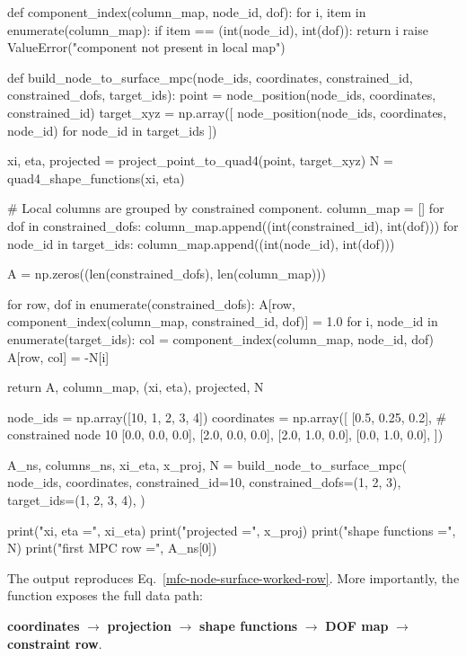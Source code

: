 \begin{python}
def component_index(column_map, node_id, dof):
    for i, item in enumerate(column_map):
        if item == (int(node_id), int(dof)):
            return i
    raise ValueError("component not present in local map")


def build_node_to_surface_mpc(node_ids, coordinates,
                              constrained_id, constrained_dofs,
                              target_ids):
    point = node_position(node_ids, coordinates, constrained_id)
    target_xyz = np.array([
        node_position(node_ids, coordinates, node_id)
        for node_id in target_ids
    ])

    xi, eta, projected = project_point_to_quad4(point, target_xyz)
    N = quad4_shape_functions(xi, eta)

    # Local columns are grouped by constrained component.
    column_map = []
    for dof in constrained_dofs:
        column_map.append((int(constrained_id), int(dof)))
        for node_id in target_ids:
            column_map.append((int(node_id), int(dof)))

    A = np.zeros((len(constrained_dofs), len(column_map)))

    for row, dof in enumerate(constrained_dofs):
        A[row, component_index(column_map, constrained_id, dof)] = 1.0
        for i, node_id in enumerate(target_ids):
            col = component_index(column_map, node_id, dof)
            A[row, col] = -N[i]

    return A, column_map, (xi, eta), projected, N


node_ids = np.array([10, 1, 2, 3, 4])
coordinates = np.array([
    [0.5, 0.25, 0.2],  # constrained node 10
    [0.0, 0.0,  0.0],
    [2.0, 0.0,  0.0],
    [2.0, 1.0,  0.0],
    [0.0, 1.0,  0.0],
])

A_ns, columns_ns, xi_eta, x_proj, N = build_node_to_surface_mpc(
    node_ids,
    coordinates,
    constrained_id=10,
    constrained_dofs=(1, 2, 3),
    target_ids=(1, 2, 3, 4),
)

print("xi, eta =", xi_eta)
print("projected =", x_proj)
print("shape functions =", N)
print("first MPC row =", A_ns[0])
\end{python}

The output reproduces Eq.~\eqref{mfc-node-surface-worked-row}. More importantly,
the function exposes the full data path:

\begin{center}
\textbf{coordinates}
$\rightarrow$
\textbf{projection}
$\rightarrow$
\textbf{shape functions}
$\rightarrow$
\textbf{DOF map}
$\rightarrow$
\textbf{constraint row}.
\end{center}

